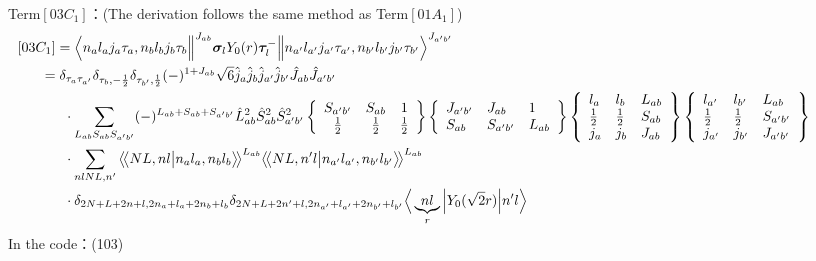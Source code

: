 \documentclass[master]{shnuthesis}
\newcommand{\llangle}{\big\langle\!\big\langle}
\newcommand{\rrangle}{\big\rangle\!\big\rangle}
\newcommand{\ap}{a^\prime}
\newcommand{\bp}{b^\prime}
\newcommand{\il}{\!\!\!\!\!\!\!\!\!\!}
\newcommand{\ii}{\!\!\!\!\!\!\!\!\!\!\!\!\!\!\!\!\!\!\!\!}
\begin{document}
{\color{red}Term$[03C_1]$：}(The derivation follows the same method as Term$[01A_1]$)
\begin{align}
    &\ii [03C_1] = \Big\langle n_a l_a j_a \tau_a, n_b l_b j_b \tau_b \Big\|^{J_{ab}} \bm{\sigma}_l Y_0(r) \bm{\tau}_l^- \Big\| n_{\ap} l_{\ap} j_{\ap} \tau_{\ap}, n_{\bp} l_{\bp} j_{\bp} \tau_{\bp} \Big\rangle^{J_{\ap \bp}} \\
    &\il = \delta_{\tau_a \tau_{\ap}}\delta_{\tau_b, -\frac{1}{2}}\delta_{\tau_{\bp}, \frac{1}{2}} (-)^{1+J_{ab}}\sqrt{6}\hat{j}_a\hat{j}_b\hat{j}_{\ap}\hat{j}_{\bp}\hat{J}_{ab}\hat{J}_{\ap\bp}  \notag\\
    & \cdot \sum_{L_{ab}S_{ab}S_{\ap\bp}} (-)^{L_{ab}+S_{ab}+S_{\ap\bp}} \hat{L}_{ab}^2\hat{S}_{ab}^2\hat{S}_{\ap\bp}^2  \left\{\begin{array}{ccc} S_{\ap\bp} & S_{ab} & 1 \\ \frac{1}{2} & \frac{1}{2} & \frac{1}{2} \end{array}\right\}  \left\{\begin{array}{lll} J_{\ap\bp} & J_{ab} & 1 \\ S_{ab} & S_{\ap\bp} & L_{ab} \end{array}\right\}  \left\{\begin{array}{lll}l_{a} & l_{b} & L_{ab} \\ \frac{1}{2} & \frac{1}{2} & S_{ab} \\j_{a} & j_{b} & J_{ab} \end{array}\right\} \left\{\begin{array}{lll} l_{\ap} & l_{\bp} & L_{ab} \\ \frac{1}{2} & \frac{1}{2} & S_{\ap\bp} \\j_{\ap} & j_{\bp} & J_{\ap\bp} \end{array}\right\}  \notag \\
    & \cdot \sum_{nlNL,n^\prime} \llangle N L, n l \big| n_{a} l_{a}, n_{b} l_{b} \rrangle^{L_{ab}} \llangle N L, n^\prime l \big| n_{a^\prime} l_{a^\prime}, n_{b^\prime} l_{b^\prime} \rrangle^{L_{ab}} \notag\\
    & \cdot \delta_{2N+L+2n+l,2n_a+l_a+2n_b+l_b}\delta_{2N+L+2n^\prime+l,2n_{a^\prime}+l_{a^\prime}+2n_{b^\prime}+l_{b^\prime}} \Big\langle \underbrace{n l}_{r} \Big| Y_0(\sqrt{2}r) \Big| n^\prime l \Big\rangle
\end{align}
In the code：(103)
\end{document}
